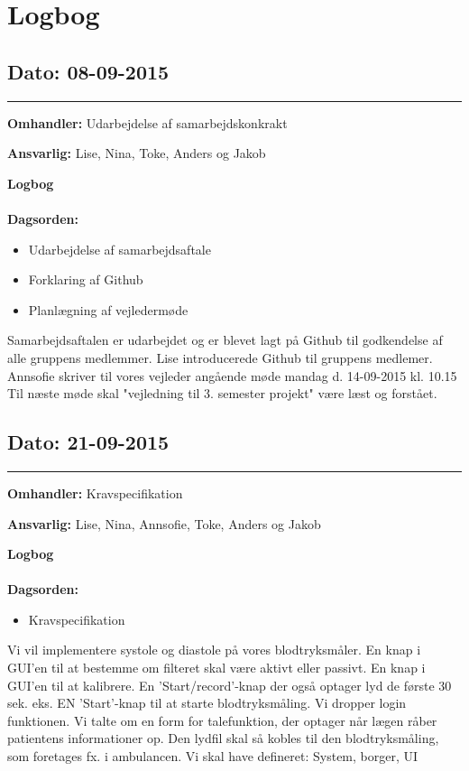 \chapter{Logbog}

\section{Dato: 08-09-2015 }
\hrule

\textbf{Omhandler:} Udarbejdelse af samarbejdskonkrakt 

\textbf{Ansvarlig:} Lise, Nina, Toke, Anders og Jakob

\textbf{Logbog}
\\
\\
\textbf{Dagsorden:}
\begin{itemize}
	\item Udarbejdelse af samarbejdsaftale
	\item Forklaring af Github
	\item Planlægning af vejledermøde
\end{itemize}

Samarbejdsaftalen er udarbejdet og er blevet lagt på Github til godkendelse af alle gruppens medlemmer.\newline 
Lise introducerede Github til gruppens medlemer.\newline 
Annsofie skriver til vores vejleder angående møde mandag d. 14-09-2015 kl. 10.15\newline 
Til næste møde skal "vejledning til 3. semester projekt" være læst og forstået.\newline
	



\section{Dato: 21-09-2015 }
\hrule

\textbf{Omhandler:} Kravspecifikation

\textbf{Ansvarlig:} Lise, Nina, Annsofie, Toke, Anders og Jakob

\textbf{Logbog}
\\
\\
\textbf{Dagsorden:}
\begin{itemize}
	\item Kravspecifikation
\end{itemize}

Vi vil implementere systole og diastole på vores blodtryksmåler.
En knap i GUI'en til at bestemme om filteret skal være aktivt eller passivt.
En knap i GUI'en til at kalibrere.
En 'Start/record'-knap der også optager lyd de første 30 sek. eks.
EN 'Start'-knap til at starte blodtryksmåling.
Vi dropper login funktionen.
Vi talte om en form for talefunktion, der optager når lægen råber patientens informationer op. Den lydfil skal så kobles til den blodtryksmåling, som foretages fx. i ambulancen. 
Vi skal have defineret: System, borger, UI




